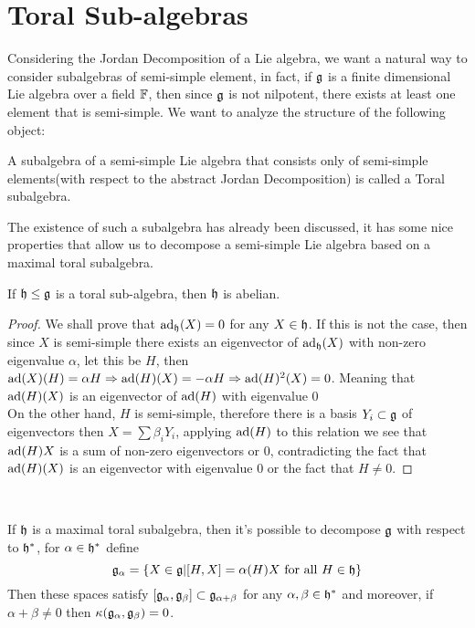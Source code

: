 \section{Toral Sub-algebras}
Considering the Jordan Decomposition of a Lie algebra, we want a natural way to consider subalgebras of semi-simple element, in fact, if $\mathfrak{g}$ is a finite dimensional Lie algebra over a field $\mathbb{F}$, then since $\mathfrak{g}$ is not nilpotent, there exists at least one element that is semi-simple. We want to analyze the structure of the following object:
\begin{defi}
A subalgebra of a semi-simple Lie algebra that consists only of semi-simple elements(with respect to the abstract Jordan Decomposition) is called a Toral subalgebra.
\label{toralsubalg Def}
\end{defi}
The existence of such a subalgebra has already been discussed, it has some nice properties that allow us to decompose a semi-simple Lie algebra based on a maximal toral subalgebra.
\begin{prop}
	If $\mathfrak{h}\le\mathfrak{g}$ is a toral sub-algebra, then $\mathfrak{h}$ is abelian.
	\label{abeliantoral}
\end{prop}
\begin{proof}
	We shall prove that $\text{ad}_{\mathfrak{h}}(X)=0$ for any $X \in \mathfrak{h}$. If this is not the case, then since $X$ is semi-simple there exists an eigenvector of $\text{ad}_{\mathfrak{h}}(X)$ with non-zero eigenvalue $\alpha$, let this be $H$, then $\text{ad}(X)(H) = \alpha H \Rightarrow \text{ad}(H)(X) = -\alpha H\Rightarrow \text{ad}(H)^2 (X)=0$. Meaning that $\text{ad}(H)(X)$ is an eigenvector of $\text{ad}(H)$ with eigenvalue $0$\\
	On the other hand, $H$ is semi-simple, therefore there is a basis ${Y_i} \subset \mathfrak{g}$ of eigenvectors then $X = \sum \beta_i Y_i$, applying $\text{ad}(H)$ to this relation we see that $\text{ad}(H)X$ is a sum of non-zero eigenvectors or $0$, contradicting the fact that $\text{ad}(H)(X)$ is an eigenvector with eigenvalue $0$ or the fact that $H\not=0$.
\end{proof}\\
\begin{prop}
If $\mathfrak{h}$ is a maximal toral subalgebra, then it's possible to decompose $\mathfrak{g}$ with respect to $\mathfrak{h}^*$, for $\alpha \in \mathfrak{h}^*$ define $$\mathfrak{g}_\alpha = \{X \in \mathfrak{g} | [H,X]=\alpha(H)X \text{ for all } H \in \mathfrak{h}\}$$
Then these spaces satisfy $[\mathfrak{g}_\alpha,\mathfrak{g}_\beta]\subset \mathfrak{g}_{\alpha+\beta}$ for any $\alpha,\beta \in \mathfrak{h}^*$ and moreover, if $\alpha+\beta \not=0$ then $\kappa(\mathfrak{g}_\alpha,\mathfrak{g}_\beta)=0$.
\label{OrthogonalityAndSum}
\end{prop}
